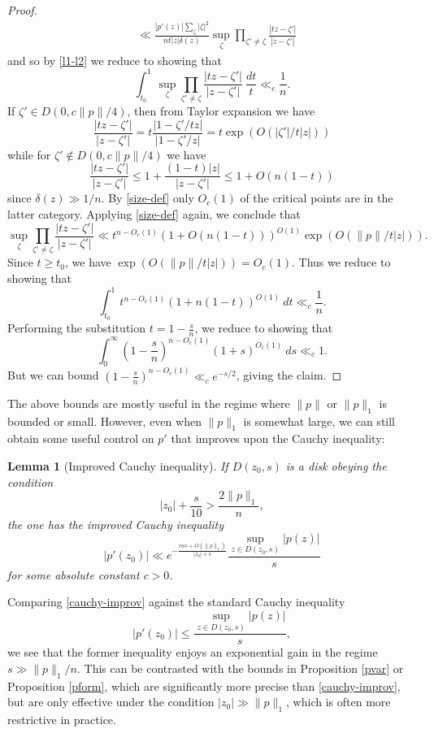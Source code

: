 \documentclass[12pt]{amsart}
\newtheorem{lemma}{Lemma}[section]
\begin{document}
\begin{proof}
\begin{align*}
&\ll \frac{|p'(z)| \sum_\zeta |\zeta|^2}{n t |z| \delta(z)} \sup_\zeta \prod_{\zeta' \neq \zeta} \frac{|tz-\zeta'|}{|z-\zeta'|}
\end{align*}
and so by \eqref{l1-l2} we reduce to showing that
$$ \int_{t_0}^1 \sup_\zeta \prod_{\zeta' \neq \zeta} \frac{|tz-\zeta'|}{|z-\zeta'|}\ \frac{dt}{t} \ll_c \frac{1}{n}.$$
If $\zeta' \in D(0, c\|p\|/4)$, then from Taylor expansion we have
$$\frac{|tz-\zeta'|}{|z-\zeta'|} = t \frac{|1-\zeta'/tz|}{|1-\zeta'/z|} = t \exp(O(|\zeta'|/t|z|)) $$
while for $\zeta' \notin D(0, c\|p\|/4)$ we have
$$  \frac{|tz-\zeta'|}{|z-\zeta'|} \leq 1 + \frac{(1-t)|z|}{|z-\zeta'|} \leq 1 + O(n(1-t))$$
since $\delta(z) \gg 1/n$.  By \eqref{size-def} only $O_c(1)$ of the critical points are in the latter category.  Applying \eqref{size-def} again, we conclude that
$$ \sup_\zeta \prod_{\zeta' \neq \zeta} \frac{|tz-\zeta'|}{|z-\zeta'|} \ll t^{n-O_c(1)} (1 + O(n(1-t)))^{O(1)} \exp( O( \|p\| / t|z| )).$$
Since $t \geq t_0$, we have $\exp( O( \|p\| / t|z| )) = O_c(1)$.  Thus we reduce to showing that
$$ \int_{t_0}^1 t^{n-O_c(1)} (1 + n(1-t))^{O(1)}\ dt \ll_c \frac{1}{n}.$$
Performing the substitution $t = 1 - \frac{s}{n}$, we reduce to showing that
$$\int_0^\infty \left(1-\frac{s}{n}\right)^{n-O_c(1)} (1 + s)^{O_c(1)}\ ds \ll_c 1.$$
But we can bound $\left(1-\frac{s}{n}\right)^{n-O_c(1)} \ll_c e^{-s/2}$, giving the claim.
\end{proof}

The above bounds are mostly useful in the regime where $\|p\|$ or $\|p\|_1$ is bounded or small.  However, even when $\|p\|_1$ is somewhat large, we can still obtain some useful control on $p'$ that improves upon the Cauchy inequality:

\begin{lemma}[Improved Cauchy inequality]\label{improv}  If $D(z_0,s)$ is a disk obeying the condition
\begin{equation}\label{zr}
|z_0| + \frac{s}{10} > \frac{2 \|p\|_1}{n},
\end{equation}
the one has the improved Cauchy inequality
\begin{equation}\label{cauchy-improv}
    |p'(z_0)| \ll e^{-\frac{cns + O(\|p\|_1)}{|z_0|+s}} \frac{\sup_{z \in D(z_0,s)} |p(z)|}{s}
\end{equation}
for some absolute constant $c>0$.
\end{lemma}

Comparing \eqref{cauchy-improv} against the standard Cauchy inequality
\begin{equation}\label{standard-cauchy}
    |p'(z_0)| \leq \frac{\sup_{z \in D(z_0,s)} |p(z)|}{s},
\end{equation}
we see that the former inequality enjoys an exponential gain in the regime $s \gg \|p\|_1/n$.  This can be contrasted with the bounds in Proposition \ref{pvar} or Proposition \ref{pform}, which are significantly more precise than \eqref{cauchy-improv}, but are only effective under the condition $|z_0| \gg \|p\|_1$, which is often more restrictive in practice.
\end{document}
